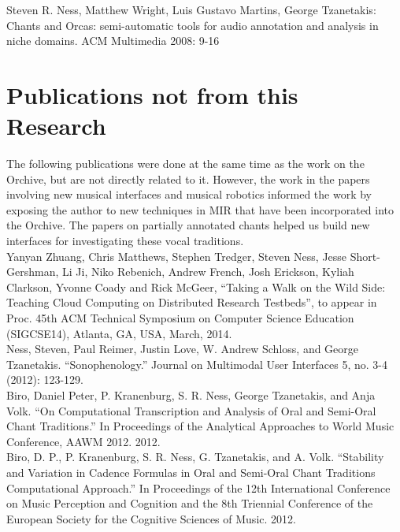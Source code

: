 \documentclass[12pt,oneside]{book}
\begin{document}
\cite{ness2008chants}
Steven R. Ness, Matthew Wright, Luis Gustavo Martins, George
Tzanetakis: Chants and Orcas: semi-automatic tools for audio
annotation and analysis in niche domains. ACM Multimedia 2008: 9-16
\\


\section{Publications not from this Research}


The following publications were done at the same time as the work on
the Orchive, but are not directly related to it.  However, the work in
the papers involving new musical interfaces and musical robotics
informed the work by exposing the author to new techniques in MIR that
have been incorporated into the Orchive.  The papers on partially
annotated chants helped us build new interfaces for investigating
these vocal traditions.
\\

\cite{zhuang2014wild}
Yanyan Zhuang, Chris Matthews, Stephen Tredger, Steven Ness, Jesse
Short-Gershman, Li Ji, Niko Rebenich, Andrew French, Josh Erickson,
Kyliah Clarkson, Yvonne Coady and Rick McGeer, ``Taking a Walk on the
Wild Side: Teaching Cloud Computing on Distributed Research
Testbeds'', to appear in Proc. 45th ACM Technical Symposium on
Computer Science Education (SIGCSE14), Atlanta, GA, USA, March, 2014.
\\

\cite{ness2012sonophenology}
Ness, Steven, Paul Reimer, Justin Love, W. Andrew Schloss, and George
Tzanetakis. ``Sonophenology.'' Journal on Multimodal User Interfaces
5, no. 3-4 (2012): 123-129.
\\

\cite{biro2012computational}
Biro, Daniel Peter, P. Kranenburg, S. R. Ness, George Tzanetakis, and
Anja Volk. ``On Computational Transcription and Analysis of Oral and
Semi-Oral Chant Traditions.'' In Proceedings of the Analytical
Approaches to World Music Conference, AAWM 2012. 2012.
\\

\cite{biro2012stability}
Biro, D. P., P. Kranenburg, S. R. Ness, G. Tzanetakis, and
A. Volk. ``Stability and Variation in Cadence Formulas in Oral and
Semi-Oral Chant Traditions Computational Approach.'' In Proceedings of
the 12th International Conference on Music Perception and Cognition
and the 8th Triennial Conference of the European Society for the
Cognitive Sciences of Music. 2012.
\\
\end{document}
